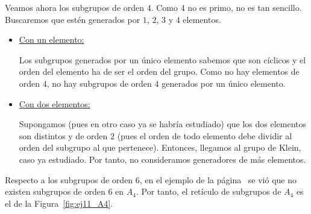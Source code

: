 \begin{ejercicio}
\begin{enumerate}
        Veamos ahora los subgrupos de orden $4$. Como $4$ no es primo, no es tan sencillo. Buscaremos que estén generados por $1$, $2$, $3$ y $4$ elementos.
        \begin{itemize}
            \item \ul{Con un elemento:}
            
            Los subgrupos generados por un único elemento sabemos que son cíclicos y el orden del elemento ha de ser el orden del grupo. Como no hay elementos de orden $4$, no hay subgrupos de orden $4$ generados por un único elemento.

            \item \ul{Con dos elementos:}
            
            Supongamos (pues en otro caso ya se habría estudiado) que los dos elementos son distintos y de orden $2$ (pues el orden de todo elemento debe dividir al orden del subgrupo al que pertenece). Entonces, llegamos al grupo de Klein, caso ya estudiado. Por tanto, no consideramos generadores de más elementos.
        \end{itemize}

        Respecto a los subgrupos de orden $6$, en el ejemplo de la página~\pageref{ejemplo:subgrupos_a4} se vió que no existen subgrupos de orden $6$ en $A_4$. Por tanto, el retículo de subgrupos de $A_4$ es el de la Figura~\ref{fig:ej11_A4}.
        \begin{figure}
            \centering
\end{figure}
\end{enumerate}
\end{ejercicio}

